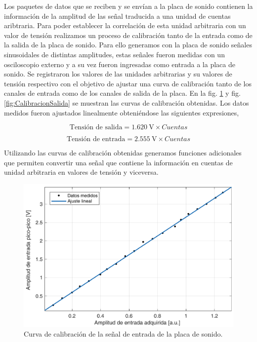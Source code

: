 \documentclass[a4paper,11pt]{article}
\begin{document}
Los paquetes de datos que se reciben y se envían a la placa de sonido
contienen la información de la amplitud de las señal traducida a una
unidad de cuentas aribtraria. Para poder establecer la correlación de
esta unidad arbitraria con un valor de tensión realizamos un proceso de
calibración tanto de la entrada como de la salida de la placa de sonido.
Para ello generamos con la placa de sonido señales sinusoidales de
distintas amplitudes, estas señales fueron medidas con un osciloscopio
externo y a su vez fueron ingresadas como entrada a la placa de sonido.
Se registraron los valores de las unidades arbitrarias y su valores de
tensión respectivo con el objetivo de ajustar una curva de calibración
tanto de los canales de entrada como de los canales de salida de la
placa.  En la fig. \ref{fig:CalibracionEntrada} y fig. 
\ref{fig:CalibracionSalida} se muestran las curvas de calibración
obtenidas.  Los datos medidos fueron ajustados linealmente obteniéndose
las siguientes expresiones,
	
\begin{equation*}
	 \text{Tensión de salida} = \SI{1.620}{\V} \times Cuentas%
\end{equation*}

\begin{equation*}
	\text{Tensión de entrada} = \SI{2.555}{\V} \times Cuentas%
\end{equation*}

Utilizando las curvas de calibración obtenidas generamos funciones
adicionales que permiten convertir una señal que contiene la información
en cuentas de unidad arbitraria en valores de tensión y viceversa.

	\begin{figure}[!h]
		\centering
		\includegraphics[width=\textwidth]{imagenes/CalibracionEntrada.pdf}
		\caption{Curva de calibración de la señal de entrada de la placa
de sonido.}
        \label{fig:CalibracionEntrada}
	\end{figure}
	
\end{document}
